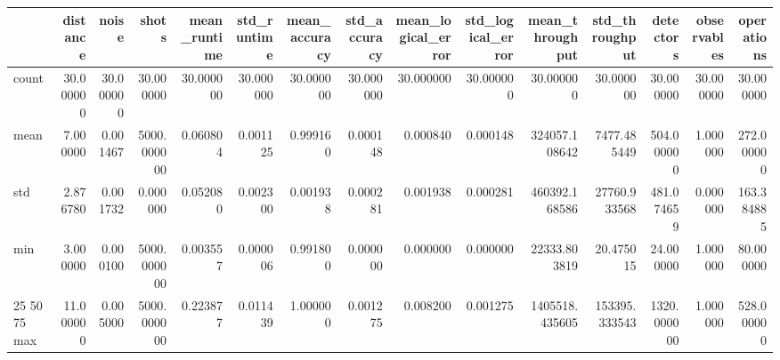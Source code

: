 \begin{tabular}{lrrrrrrrrrrrrrr}
\toprule
 & distance & noise & shots & mean_runtime & std_runtime & mean_accuracy & std_accuracy & mean_logical_error & std_logical_error & mean_throughput & std_throughput & detectors & observables & operations \\
\midrule
count & 30.000000 & 30.000000 & 30.000000 & 30.000000 & 30.000000 & 30.000000 & 30.000000 & 30.000000 & 30.000000 & 30.000000 & 30.000000 & 30.000000 & 30.000000 & 30.000000 \\
mean & 7.000000 & 0.001467 & 5000.000000 & 0.060804 & 0.001125 & 0.999160 & 0.000148 & 0.000840 & 0.000148 & 324057.108642 & 7477.485449 & 504.000000 & 1.000000 & 272.000000 \\
std & 2.876780 & 0.001732 & 0.000000 & 0.052080 & 0.002300 & 0.001938 & 0.000281 & 0.001938 & 0.000281 & 460392.168586 & 27760.933568 & 481.074659 & 0.000000 & 163.384885 \\
min & 3.000000 & 0.000100 & 5000.000000 & 0.003557 & 0.000006 & 0.991800 & 0.000000 & 0.000000 & 0.000000 & 22333.803819 & 20.475015 & 24.000000 & 1.000000 & 80.000000 \\
25%
50%
75%
max & 11.000000 & 0.005000 & 5000.000000 & 0.223877 & 0.011439 & 1.000000 & 0.001275 & 0.008200 & 0.001275 & 1405518.435605 & 153395.333543 & 1320.000000 & 1.000000 & 528.000000 \\
\bottomrule
\end{tabular}
